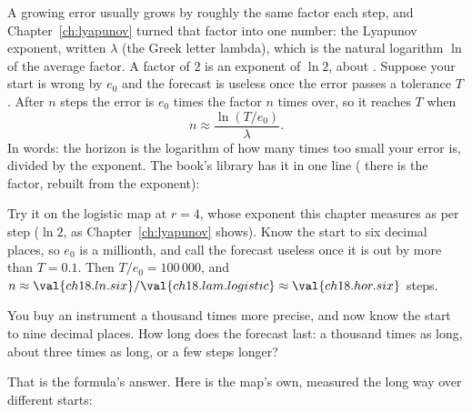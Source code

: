 \noindent
A growing error usually grows by roughly the same factor each step, and
Chapter~\ref{ch:lyapunov} turned that factor into one number: the Lyapunov
exponent, written $\lambda$ (the Greek letter lambda), which is the natural
logarithm $\ln$ of the average factor. A factor of $2$ is an exponent of
$\ln 2$, about . Suppose your start is wrong by $e_0$ and
the forecast is useless once the error passes a tolerance $T$. After $n$
steps the error is $e_0$ times the factor $n$ times over, so it reaches $T$
when
\[ n \approx \frac{\ln(T / e_0)}{\lambda}. \]
In words: the horizon is the logarithm of how many times too small your
error is, divided by the exponent. The book's library has it in one line
( there is the factor, rebuilt from the exponent):


\noindent
Try it on the logistic map at $r = 4$, whose exponent this chapter measures
as  per step ($\ln 2$, as
Chapter~\ref{ch:lyapunov} shows). Know the start to six decimal places, so
$e_0$ is a millionth, and call the forecast useless once it is out by more
than $T = \num{0.1}$. Then $T / e_0 = 100\,000$, and $n \approx
\val{ch18.ln.six} / \val{ch18.lam.logistic} \approx \val{ch18.hor.six}$
steps.

\begin{think}
You buy an instrument a thousand times more precise, and now know the start
to nine decimal places. How long does the forecast last: a thousand times as
long, about three times as long, or a few steps longer?
\end{think}
That is the formula's answer. Here is the map's own, measured the long way
over  different starts:




